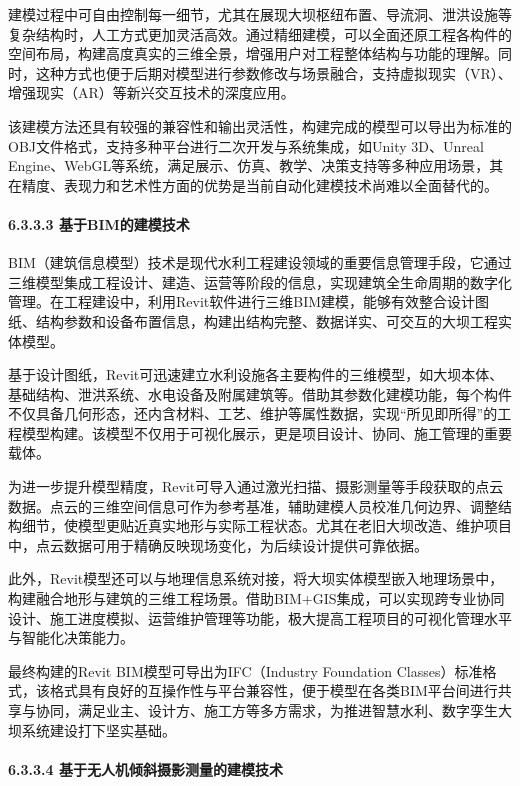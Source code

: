 建模过程中可自由控制每一细节，尤其在展现大坝枢纽布置、导流洞、泄洪设施等复杂结构时，人工方式更加灵活高效。通过精细建模，可以全面还原工程各构件的空间布局，构建高度真实的三维全景，增强用户对工程整体结构与功能的理解。同时，这种方式也便于后期对模型进行参数修改与场景融合，支持虚拟现实（VR）、增强现实（AR）等新兴交互技术的深度应用。

该建模方法还具有较强的兼容性和输出灵活性，构建完成的模型可以导出为标准的OBJ文件格式，支持多种平台进行二次开发与系统集成，如Unity 3D、Unreal Engine、WebGL等系统，满足展示、仿真、教学、决策支持等多种应用场景，其在精度、表现力和艺术性方面的优势是当前自动化建模技术尚难以全面替代的。

\hypertarget{ux57faux4e8ebimux7684ux5efaux6a21ux6280ux672f}{%
\paragraph{6.3.3.3 基于BIM的建模技术}\label{ux57faux4e8ebimux7684ux5efaux6a21ux6280ux672f}}

BIM（建筑信息模型）技术是现代水利工程建设领域的重要信息管理手段，它通过三维模型集成工程设计、建造、运营等阶段的信息，实现建筑全生命周期的数字化管理。在工程建设中，利用Revit软件进行三维BIM建模，能够有效整合设计图纸、结构参数和设备布置信息，构建出结构完整、数据详实、可交互的大坝工程实体模型。

基于设计图纸，Revit可迅速建立水利设施各主要构件的三维模型，如大坝本体、基础结构、泄洪系统、水电设备及附属建筑等。借助其参数化建模功能，每个构件不仅具备几何形态，还内含材料、工艺、维护等属性数据，实现``所见即所得''的工程模型构建。该模型不仅用于可视化展示，更是项目设计、协同、施工管理的重要载体。

为进一步提升模型精度，Revit可导入通过激光扫描、摄影测量等手段获取的点云数据。点云的三维空间信息可作为参考基准，辅助建模人员校准几何边界、调整结构细节，使模型更贴近真实地形与实际工程状态。尤其在老旧大坝改造、维护项目中，点云数据可用于精确反映现场变化，为后续设计提供可靠依据。

此外，Revit模型还可以与地理信息系统对接，将大坝实体模型嵌入地理场景中，构建融合地形与建筑的三维工程场景。借助BIM+GIS集成，可以实现跨专业协同设计、施工进度模拟、运营维护管理等功能，极大提高工程项目的可视化管理水平与智能化决策能力。

最终构建的Revit BIM模型可导出为IFC（Industry Foundation Classes）标准格式，该格式具有良好的互操作性与平台兼容性，便于模型在各类BIM平台间进行共享与协同，满足业主、设计方、施工方等多方需求，为推进智慧水利、数字孪生大坝系统建设打下坚实基础。

\hypertarget{ux57faux4e8eux65e0ux4ebaux673aux503eux659cux6444ux5f71ux6d4bux91cfux7684ux5efaux6a21ux6280ux672f}{%
\paragraph{6.3.3.4 基于无人机倾斜摄影测量的建模技术}\label{ux57faux4e8eux65e0ux4ebaux673aux503eux659cux6444ux5f71ux6d4bux91cfux7684ux5efaux6a21ux6280ux672f}}

